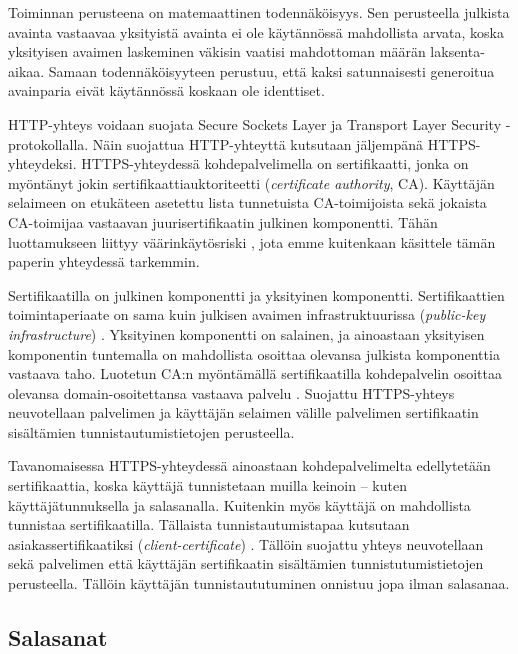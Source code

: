 \documentclass{tktltiki}
\begin{document}
Toiminnan perusteena on matemaattinen todennäköisyys. Sen perusteella julkista avainta vastaavaa yksityistä avainta ei ole käytännössä mahdollista arvata, koska yksityisen avaimen laskeminen väkisin vaatisi mahdottoman määrän laksenta-aikaa. Samaan todennäköisyyteen perustuu, että kaksi satunnaisesti generoitua avainparia eivät käytännössä koskaan ole identtiset.

HTTP-yhteys voidaan suojata Secure Sockets Layer ja Transport Layer Security -protokollalla. Näin suojattua HTTP-yhteyttä kutsutaan jäljempänä HTTPS-yhteydeksi. HTTPS-yhteydessä kohdepalvelimella on sertifikaatti, jonka on myöntänyt jokin sertifikaattiauktoriteetti (\emph{certificate authority}, CA). Käyttäjän selaimeen on etukäteen asetettu lista tunnetuista CA-toimijoista sekä jokaista CA-toimijaa vastaavan juurisertifikaatin julkinen komponentti. Tähän luottamukseen liittyy väärinkäytösriski \cite{certified_lies, eff_ssliverse}, jota emme kuitenkaan käsittele tämän paperin yhteydessä tarkemmin.

Sertifikaatilla on julkinen komponentti ja yksityinen komponentti. 
Sertifikaattien toimintaperiaate on sama kuin julkisen avaimen infrastruktuurissa (\emph{public-key infrastructure}) \cite{nist_pki_intro, henry_story_foaf_ssl}.
Yksityinen komponentti on salainen, ja ainoastaan yksityisen komponentin tuntemalla on mahdollista osoittaa olevansa julkista komponenttia vastaava taho. Luotetun CA:n myöntämällä sertifikaatilla kohdepalvelin osoittaa olevansa domain-osoitettansa vastaava palvelu \cite{authenticated_names}.
Suojattu HTTPS-yhteys neuvotellaan palvelimen ja käyttäjän selaimen välille palvelimen sertifikaatin sisältämien tunnistautumistietojen perusteella.

Tavanomaisessa HTTPS-yhteydessä ainoastaan kohdepalvelimelta edellytetään sertifikaattia, koska käyttäjä tunnistetaan muilla keinoin -- kuten käyttäjätunnuksella ja salasanalla. 
Kuitenkin myös käyttäjä on mahdollista tunnistaa sertifikaatilla. Tällaista tunnistautumistapaa kutsutaan asiakassertifikaatiksi (\emph{client-certificate}) \cite{henry_story_foaf_ssl}.
Tällöin suojattu yhteys neuvotellaan sekä palvelimen että käyttäjän sertifikaatin sisältämien tunnistutumistietojen perusteella. 
Tällöin käyttäjän tunnistaututuminen onnistuu jopa ilman salasanaa.


\subsection{Salasanat}
 \label{sec:passwords}
 
\end{document}
